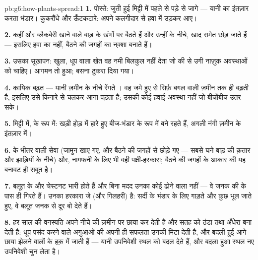 \begin{solution}{pb:g6:how-plants-spread:1}
\textbf{1.} पोस्ते: जुती हुई मिट्टी में पहले से पड़े  से जागे ---
यानी  का इंतज़ार करता भंडार। कुकरौंधे और ऊँटकटारे: अपने कलगीदार
 से हवा में उड़कर आए।

\textbf{2.} कहीं और ब्लैकबेरी खाने वाले  बाड़ के खंभों पर बैठते
हैं और  उन्हीं के नीचे, खाद समेत छोड़ जाते हैं --- इसलिए  हवा
का नहीं, बैठने की जगहों का नक़्शा बनाते हैं।

\textbf{3.} उसका सूखापन: खुला, धूप वाला खेत वह नमी बिलकुल नहीं देता जो
 की  से उगी नाज़ुक अवस्थाओं को चाहिए। आगमन तो हुआ; बसना
ठुकरा दिया गया।

\textbf{4.} कायिक बढ़त --- यानी ज़मीन के नीचे रेंगते । वह जमे हुए
 से सिर्फ़ बगल वाली ज़मीन तक ही बढ़ती है, इसलिए उसे किनारे से चलकर
आना पड़ता है; उसकी कोई हवाई अवस्था नहीं जो बीचोंबीच उतर सके।

\textbf{5.} मिट्टी में,  के रूप में: खड़ी होड़ में हारे हुए
 बीज-भंडार के रूप में बने रहते हैं, अगली नंगी ज़मीन के इंतज़ार
में।

\textbf{6.}  के भीतर वाली सेवा (जामुन खाए गए, और  बैठने की जगहों
से छोड़े गए --- सबसे घने बाड़ की क़तार और झाड़ियों के नीचे) और, नागफनी
के लिए भी वही पक्षी-हरकारा; बैठने की जगहों के आकार की यह बनावट ही सबूत
है।

\textbf{7.} बलूत के  और चेस्टनट भारी होते हैं और बिना मदद उनका कोई
ढोने वाला नहीं --- वे जनक की  के पास ही गिरते हैं। उनका हरकारा जे
 (और गिलहरी) है: सर्दी के भंडार के लिए  गाड़ते और कुछ भूल जाते
हुए, वे बलूत जनक से दूर बो देते हैं।

\textbf{8.} हर साल की वनस्पति अपने नीचे की ज़मीन पर छाया कर देती है और
सतह को ठंडा तथा अँधेरा बना देती है: धूप पसंद करने वाले अगुआओं की अपनी
ही सफलता उनकी  मिटा देती है, और बदली हुई  आगे
छाया झेलने वालों के हक़ में जाती हैं --- यानी उपनिवेशी स्थल को बदल देते
हैं, और बदला हुआ स्थल नए उपनिवेशी चुन लेता है।


\end{solution}
